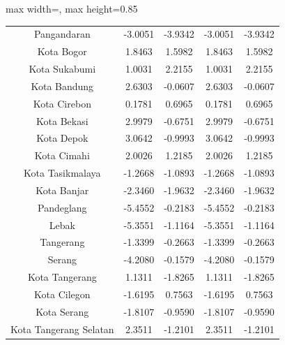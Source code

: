 \begin{table}[H]
\begin{adjustbox}{max width=\textwidth, max height=0.85\textheight}
\begin{tabular}{|c|c|c|c|c|}
Pangandaran & -3.0051 & -3.9342 & -3.0051 & -3.9342 \\
Kota Bogor & 1.8463 & 1.5982 & 1.8463 & 1.5982 \\
Kota Sukabumi & 1.0031 & 2.2155 & 1.0031 & 2.2155 \\
Kota Bandung & 2.6303 & -0.0607 & 2.6303 & -0.0607 \\
Kota Cirebon & 0.1781 & 0.6965 & 0.1781 & 0.6965 \\
Kota Bekasi & 2.9979 & -0.6751 & 2.9979 & -0.6751 \\
Kota Depok & 3.0642 & -0.9993 & 3.0642 & -0.9993 \\
Kota Cimahi & 2.0026 & 1.2185 & 2.0026 & 1.2185 \\
Kota Tasikmalaya & -1.2668 & -1.0893 & -1.2668 & -1.0893 \\
Kota Banjar & -2.3460 & -1.9632 & -2.3460 & -1.9632 \\
Pandeglang & -5.4552 & -0.2183 & -5.4552 & -0.2183 \\
Lebak & -5.3551 & -1.1164 & -5.3551 & -1.1164 \\
Tangerang & -1.3399 & -0.2663 & -1.3399 & -0.2663 \\
Serang & -4.2080 & -0.1579 & -4.2080 & -0.1579 \\
Kota Tangerang & 1.1311 & -1.8265 & 1.1311 & -1.8265 \\
Kota Cilegon & -1.6195 & 0.7563 & -1.6195 & 0.7563 \\
Kota Serang & -1.8107 & -0.9590 & -1.8107 & -0.9590 \\
Kota Tangerang Selatan & 2.3511 & -1.2101 & 2.3511 & -1.2101 \\
\hline
\end{tabular}
\end{adjustbox}
\end{table}